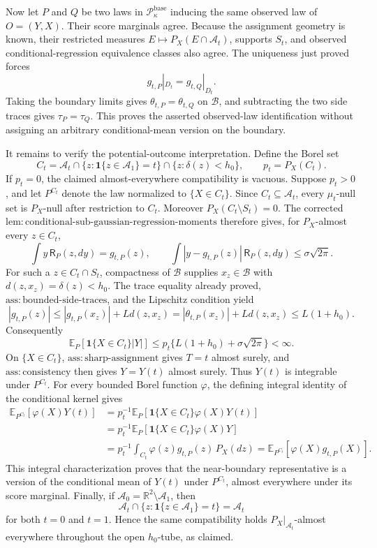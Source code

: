 Now let \(P\) and \(Q\) be two laws in \(\mathcal P_{\kappa}^{\mathrm{base}}\) inducing the same observed law of \(O=(Y,X)\). Their score marginals agree. Because the assignment geometry is known, their restricted measures \(E\mapsto P_X(E\cap\mathcal A_t)\), supports \(S_t\), and observed conditional-regression equivalence classes also agree. The uniqueness just proved forces
\[
 g_{t,P}|_{D_t}=g_{t,Q}|_{D_t}.
\]
Taking the boundary limits gives \(\theta_{t,P}=\theta_{t,Q}\) on \(\mathcal B\), and subtracting the two side traces gives \(\tau_P=\tau_Q\). This proves the asserted observed-law identification without assigning an arbitrary conditional-mean version on the boundary.

It remains to verify the potential-outcome interpretation. Define the Borel set
\[
 C_t=\mathcal A_t\cap\{z:\mathbf 1\{z\in\mathcal A_1\}=t\}\cap\{z:\delta(z)<h_0\},
 \qquad p_t=P_X(C_t).
\]
If \(p_t=0\), the claimed almost-everywhere compatibility is vacuous. Suppose \(p_t>0\), and let \(P^{C_t}\) denote the law normalized to \(\{X\in C_t\}\). Since \(C_t\subseteq\mathcal A_t\), every \(\mu_t\)-null set is \(P_X\)-null after restriction to \(C_t\). Moreover \(P_X(C_t\setminus S_t)=0\). The corrected \(\mathrm{lem:conditional\text{-}sub\text{-}gaussian\text{-}regression\text{-}moments}\) therefore gives, for \(P_X\)-almost every \(z\in C_t\),
\[
 \int y\,\mathsf R_P(z,dy)=g_{t,P}(z),\qquad
 \int|y-g_{t,P}(z)|\,\mathsf R_P(z,dy)\le\sigma\sqrt{2\pi}.
\]
For such a \(z\in C_t\cap S_t\), compactness of \(\mathcal B\) supplies \(x_z\in\mathcal B\) with \(d(z,x_z)=\delta(z)<h_0\). The trace equality already proved, \(\mathrm{ass:bounded\text{-}side\text{-}traces}\), and the Lipschitz condition yield
\[
 |g_{t,P}(z)|
 \le |g_{t,P}(x_z)|+Ld(z,x_z)
 =|\theta_{t,P}(x_z)|+Ld(z,x_z)
 \le L(1+h_0).
\]
Consequently
\[
 \mathbb E_P[\mathbf 1\{X\in C_t\}|Y|]
 \le p_t\{L(1+h_0)+\sigma\sqrt{2\pi}\}<\infty.
\]
On \(\{X\in C_t\}\), \(\mathrm{ass:sharp\text{-}assignment}\) gives \(T=t\) almost surely, and \(\mathrm{ass:consistency}\) then gives \(Y=Y(t)\) almost surely. Thus \(Y(t)\) is integrable under \(P^{C_t}\). For every bounded Borel function \(\varphi\), the defining integral identity of the conditional kernel gives
\[
\begin{aligned}
 \mathbb E_{P^{C_t}}[\varphi(X)Y(t)]
 &=p_t^{-1}\mathbb E_P[\mathbf 1\{X\in C_t\}\varphi(X)Y(t)]\\
 &=p_t^{-1}\mathbb E_P[\mathbf 1\{X\in C_t\}\varphi(X)Y]\\
 &=p_t^{-1}\int_{C_t}\varphi(z)g_{t,P}(z)\,P_X(dz)
 =\mathbb E_{P^{C_t}}[\varphi(X)g_{t,P}(X)].
\end{aligned}
\]
This integral characterization proves that the near-boundary representative is a version of the conditional mean of \(Y(t)\) under \(P^{C_t}\), almost everywhere under its score marginal. Finally, if \(\mathcal A_0=\mathbb R^2\setminus\mathcal A_1\), then
\[
 \mathcal A_t\cap\{z:\mathbf 1\{z\in\mathcal A_1\}=t\}=\mathcal A_t
\]
for both \(t=0\) and \(t=1\). Hence the same compatibility holds \(P_X|_{\mathcal A_t}\)-almost everywhere throughout the open \(h_0\)-tube, as claimed.